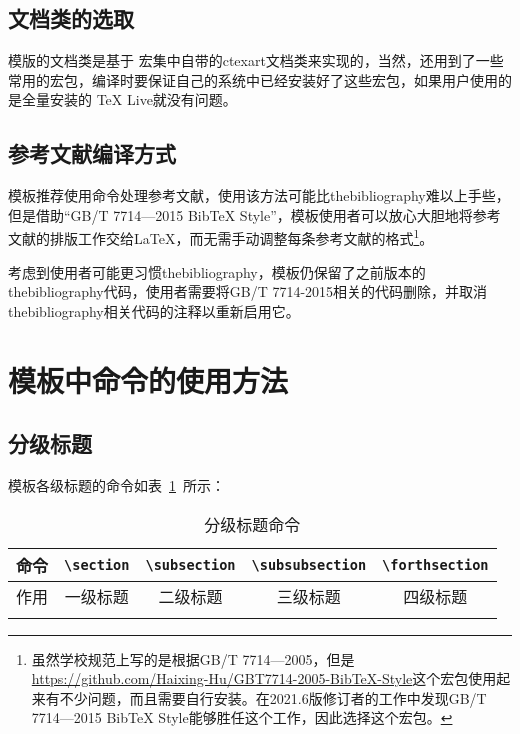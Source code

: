 \subsection{文档类的选取}

模版的文档类是基于\CTeX{} 宏集中自带的ctexart文档类来实现的\cite{x5}，当然，还用到了一些常用的宏包，编译时要保证自己的系统中已经安装好了这些宏包，如果用户使用的是全量安装的 TeX Live就没有问题。

\subsection{参考文献编译方式}

模板推荐使用\verb||命令处理参考文献，使用该方法可能比thebibliography难以上手些，但是借助“GB/T 7714—2015 BibTeX Style”\cite{x6}，模板使用者可以放心大胆地将参考文献的排版工作交给\LaTeX ，而无需手动调整每条参考文献的格式\footnote{虽然学校规范上写的是根据GB/T 7714—2005，但是\url{https://github.com/Haixing-Hu/GBT7714-2005-BibTeX-Style}这个宏包使用起来有不少问题，而且需要自行安装。在2021.6版修订者的工作中发现GB/T 7714—2015 BibTeX Style能够胜任这个工作，因此选择这个宏包。}。

考虑到使用者可能更习惯thebibliography，模板仍保留了之前版本的thebibliography代码，使用者需要将GB/T 7714-2015相关的代码删除，并取消thebibliography相关代码的注释以重新启用它。

\section{模板中命令的使用方法}

\subsection{分级标题}

模板各级标题的命令如表~\ref{table_title_command}~所示：

\begin{table}[htbp!]
    \centering
    \caption{分级标题命令}
    \label{table_title_command}
    \begin{tabular}{ccccc}
        \whline
        命令 & \verb|\section| & \verb|\subsection| & \verb|\subsubsection| & \verb|\forthsection| \\
        \hline
        作用 & 一级标题        & 二级标题           & 三级标题              & 四级标题             \\
        \whline
    \end{tabular}
\end{table}

